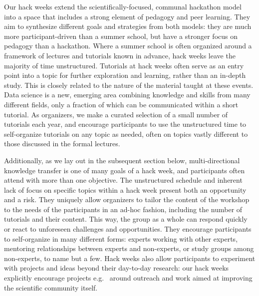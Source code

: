 Our hack weeks extend the scientifically-focused, communal hackathon model into a space that includes a strong element of pedagogy and peer learning. They aim to synthesize different goals and strategies from both models: they are much more participant-driven than a summer school, but have a stronger focus on pedagogy than a hackathon. Where a summer school is often organized around a framework of lectures and tutorials known in advance, hack weeks leave the majority of time unstructured. Tutorials at hack weeks often serve as an entry point into a topic for further exploration and learning, rather than an in-depth study. This is closely related to the nature of the material taught at these events. Data science is a new, emerging area combining knowledge and skills from many different fields, only a fraction of which can be communicated within a short tutorial. As organizers, we make a curated selection of a small number of tutorials each year, and encourage participants to use the unstructured time to self-organize tutorials on any topic as needed, often on topics vastly different to those discussed in the formal lectures. 

Additionally, as we lay out in the subsequent section below, multi-directional knowledge transfer is one of many goals of a hack week, and participants often attend with more than one objective. The unstructured schedule and inherent lack of focus on specific topics within a hack week present both an opportunity and a risk. They uniquely allow organizers to tailor the content of the workshop to the needs of the participants in an ad-hoc fashion, including the number of tutorials and their content. This way, the group as a whole can respond quickly or react to unforeseen challenges and opportunities. They encourage participants to self-organize in many different forms: experts working with other experts, mentoring relationships between experts and non-experts, or study groups among non-experts, to name but a few. Hack weeks also allow participants to experiment with projects and ideas beyond their day-to-day research: our hack weeks explicitly encourage projects e.g.~ around outreach and work aimed at improving the scientific community itself. 

